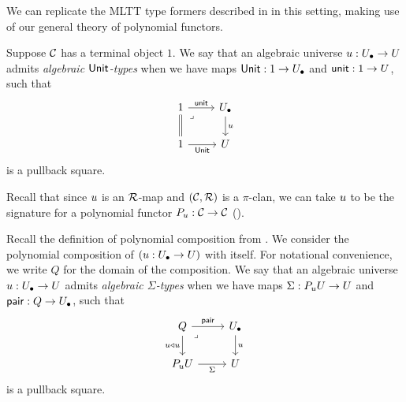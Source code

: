We can replicate the MLTT type formers described in \cite{awodey2025} in this setting,
making use of our general theory of polynomial functors.

\begin{definition}
  \label{def:alg-unit-type-mltt}
  Suppose $\mathcal{C}$ has a terminal object $1$.
  We say that an algebraic universe ${u} : {U_\bullet} \to U$ admits
  \emph{algebraic $\mathsf{Unit}$-types} when we have maps
  $\mathsf{Unit} : 1 \to {U_\bullet}$ and $\mathsf{unit} : 1 \to U$, such that
  \[\begin{tikzcd}
    1 & \Ulow \\
    1 & \U
    \arrow["\unit", from=1-1, to=1-2]
    \arrow[equals, from=1-1, to=2-1]
    \arrow["\lrcorner"{anchor=center, pos=0.125}, draw=none, from=1-1, to=2-2]
    \arrow["\uu", from=1-2, to=2-2]
    \arrow["\Unit"', from=2-1, to=2-2]
  \end{tikzcd}\]
  is a pullback square.
\end{definition}

Recall that since ${u}$ is an $\mathcal{R}$-map and $(\mathcal{C},\mathcal{R})$ is a $\pi$-clan,
we can take ${u}$ to be the signature for a polynomial functor $P_{u} : \mathcal{C} \to \mathcal{C}$
().

\begin{definition}
    \label{def:alg-sig-type-mltt}
    
    Recall the definition of polynomial composition from .
    We consider the polynomial composition of $({u} : {U_\bullet} \to U)$ with itself.
    For notational convenience, we write $Q$ for the domain of the composition.
    We say that an
    algebraic universe ${u}:{U_\bullet}\to U$ admits
    \emph{algebraic $\Sigma$-types} when we have maps
    $\Sigma : P_{u} U \to U$ and $\mathsf{pair}: Q \to {U_\bullet}$,
    such that
    \[ \begin{tikzcd}
      Q & \Ulow \\
      {P_\uu\U} & \U
      \arrow["\pair", from=1-1, to=1-2]
      \arrow["{\uu \pcomp \uu}"', from=1-1, to=2-1]
      \arrow["\lrcorner"{anchor=center, pos=0.125}, draw=none, from=1-1, to=2-2]
      \arrow["\uu", from=1-2, to=2-2]
      \arrow["\Sigma"', from=2-1, to=2-2]
    \end{tikzcd} \]
    is a pullback square.
\end{definition}

